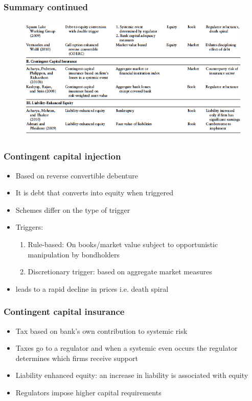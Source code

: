 \documentclass[11pt]{beamer}
\begin{document}
\begin{frame}
\frametitle{Summary continued}
\begin{figure}
\includegraphics[width=\textwidth]{6_6.png}
\end{figure}
\end{frame}

\begin{frame}
\frametitle{Contingent capital injection}
\begin{itemize}\itemsep10pt
\item Based on reverse convertible debenture
\item It is debt that converts into equity when triggered
\item Schemes differ on the type of trigger
\item Triggers:
\begin{enumerate}\itemsep5pt
\item Rule-based: On books/market value subject to opportunistic manipulation by bondholders
\item Discretionary trigger: based on aggregate market measures
\end{enumerate}
\item leads to a rapid decline in prices i.e. death spiral
\end{itemize}
\end{frame}

\begin{frame}
\frametitle{Contingent capital insurance}
\begin{itemize}
\item Tax based on bank's own contribution to systemic risk
\item Taxes go to a regulator and when a systemic even occurs the regulator determines which firms receive support
\item Liability enhanced equity: an increase in liability is associated with equity
\item Regulators impose higher capital requirements
\end{itemize}
\end{frame}
\end{document}
